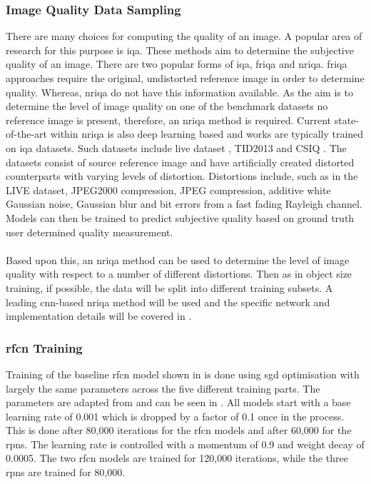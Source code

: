 \subsubsection{Image Quality Data Sampling}
There are many choices for computing the quality of an image. A popular area of research for this purpose is \gls{iqa}. These methods aim to determine the subjective quality of an image. There are two popular forms of \gls{iqa}, \gls{friqa} and \gls{nriqa}. \gls{friqa} approaches require the original, undistorted reference image in order to determine quality. Whereas, \gls{nriqa} do not have this information available. As the aim is to determine the level of image quality on one of the benchmark datasets no reference image is present, therefore, an \gls{nriqa} method is required. Current state-of-the-art within \gls{nriqa} is also deep learning based and works are typically trained on \gls{iqa} datasets. Such datasets include \gls{live} dataset \cite{livepaper} \cite{liveweb}, TID2013 \cite{tid2013} and CSIQ \cite{csiq}. The datasets consist of source reference image and have artificially created distorted counterparts with varying levels of distortion. Distortions include, such as in the LIVE dataset, JPEG2000 compression, JPEG compression, additive white Gaussian noise, Gaussian blur and bit errors from a fast fading Rayleigh channel. Models can then be trained to predict subjective quality based on ground truth user determined quality measurement.
\\\\
Based upon this, an \gls{nriqa} method can be used to determine the level of image quality with respect to a number of different distortions. Then as in object size training, if possible, the data will be split into different training subsets. A leading \gls{cnn}-based \gls{nriqa} method will be used and the specific network and implementation details will be covered in .

\subsubsection{\gls{rfcn} Training}
Training of the baseline \gls{rfcn} model shown in  is done using \gls{sgd} optimisation with largely the same parameters across the five different training parts. The parameters are adapted from \cite{rfcn} and can be seen in . All models start with a base learning rate of 0.001 which is dropped by a factor of 0.1 once in the process. This is done after 80,000 iterations for the \gls{rfcn} models and after 60,000 for the \glspl{rpn}. The learning rate is controlled with a momentum of 0.9 and weight decay of 0.0005. The two \gls{rfcn} models are trained for 120,000 iterations, while the three \glspl{rpn} are trained for 80,000.

